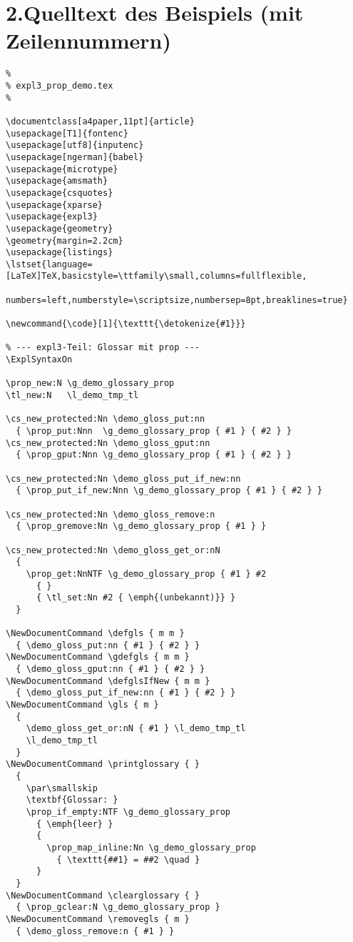 \documentclass[a4paper,11pt]{article}
\newcommand{\code}[1]{\texttt{\detokenize{#1}}}
\begin{document}
\section*{2.\;Quelltext des Beispiels (mit Zeilennummern)}
\medskip
\begin{lstlisting}
%
% expl3_prop_demo.tex
%

\documentclass[a4paper,11pt]{article}
\usepackage[T1]{fontenc}
\usepackage[utf8]{inputenc}
\usepackage[ngerman]{babel}
\usepackage{microtype}
\usepackage{amsmath}
\usepackage{csquotes}
\usepackage{xparse}
\usepackage{expl3}
\usepackage{geometry}
\geometry{margin=2.2cm}
\usepackage{listings}
\lstset{language=[LaTeX]TeX,basicstyle=\ttfamily\small,columns=fullflexible,
        numbers=left,numberstyle=\scriptsize,numbersep=8pt,breaklines=true}

\newcommand{\code}[1]{\texttt{\detokenize{#1}}}

% --- expl3-Teil: Glossar mit prop ---
\ExplSyntaxOn

\prop_new:N \g_demo_glossary_prop
\tl_new:N   \l_demo_tmp_tl

\cs_new_protected:Nn \demo_gloss_put:nn
  { \prop_put:Nnn  \g_demo_glossary_prop { #1 } { #2 } }
\cs_new_protected:Nn \demo_gloss_gput:nn
  { \prop_gput:Nnn \g_demo_glossary_prop { #1 } { #2 } }

\cs_new_protected:Nn \demo_gloss_put_if_new:nn
  { \prop_put_if_new:Nnn \g_demo_glossary_prop { #1 } { #2 } }

\cs_new_protected:Nn \demo_gloss_remove:n
  { \prop_gremove:Nn \g_demo_glossary_prop { #1 } }

\cs_new_protected:Nn \demo_gloss_get_or:nN
  {
    \prop_get:NnNTF \g_demo_glossary_prop { #1 } #2
      { }
      { \tl_set:Nn #2 { \emph{(unbekannt)}} }
  }

\NewDocumentCommand \defgls { m m }
  { \demo_gloss_put:nn { #1 } { #2 } }
\NewDocumentCommand \gdefgls { m m }
  { \demo_gloss_gput:nn { #1 } { #2 } }
\NewDocumentCommand \defglsIfNew { m m }
  { \demo_gloss_put_if_new:nn { #1 } { #2 } }
\NewDocumentCommand \gls { m }
  {
    \demo_gloss_get_or:nN { #1 } \l_demo_tmp_tl
    \l_demo_tmp_tl
  }
\NewDocumentCommand \printglossary { }
  {
    \par\smallskip
    \textbf{Glossar: }
    \prop_if_empty:NTF \g_demo_glossary_prop
      { \emph{leer} }
      {
        \prop_map_inline:Nn \g_demo_glossary_prop
          { \texttt{##1} = ##2 \quad }
      }
  }
\NewDocumentCommand \clearglossary { }
  { \prop_gclear:N \g_demo_glossary_prop }
\NewDocumentCommand \removegls { m }
  { \demo_gloss_remove:n { #1 } }


\end{lstlisting}
\end{document}
